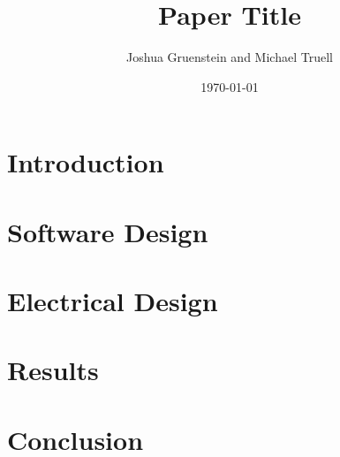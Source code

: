 \documentclass[a4paper,12pt]{article}
\title{Paper Title}
\author{Joshua Gruenstein and Michael Truell}
\date{\today}
\begin{document}
\maketitle



\section{Introduction}



\section{Software Design}



\section{Electrical Design}



\section{Results}



\section{Conclusion}



\pagebreak

\end{document}
